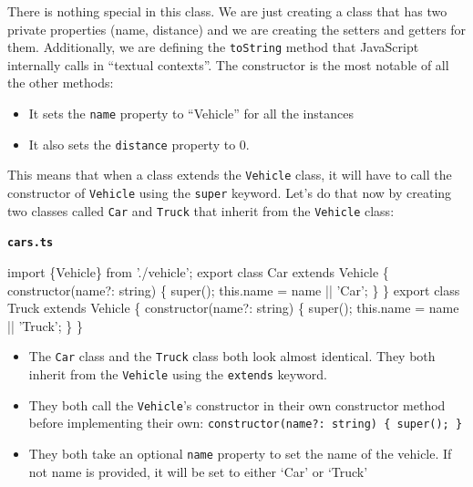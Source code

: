 \documentclass[12pt,]{article}
\newenvironment{Shaded}{}{}
\newcommand{\KeywordTok}[1]{\textcolor[rgb]{0.00,0.00,1.00}{{#1}}}
\newcommand{\FunctionTok}[1]{{#1}}
\newcommand{\NormalTok}[1]{{#1}}
\providecommand{\tightlist}{%
  \setlength{\itemsep}{0pt}\setlength{\parskip}{0pt}}
\begin{document}
There is nothing special in this class. We are just creating a class
that has two private properties (name, distance) and we are creating the
setters and getters for them. Additionally, we are defining the
\texttt{toString} method that JavaScript internally calls in ``textual
contexts''. The constructor is the most notable of all the other
methods:

\begin{itemize}
\tightlist
\item
  It sets the \texttt{name} property to ``Vehicle'' for all the
  instances
\item
  It also sets the \texttt{distance} property to 0.
\end{itemize}

This means that when a class extends the \texttt{Vehicle} class, it will
have to call the constructor of \texttt{Vehicle} using the
\texttt{super} keyword. Let's do that now by creating two classes called
\texttt{Car} and \texttt{Truck} that inherit from the \texttt{Vehicle}
class:

\textbf{\texttt{cars.ts}}

\begin{Shaded}
\begin{Highlighting}[numbers=left,,]
\KeywordTok{import \{Vehicle\} from './vehicle';}
\NormalTok{export }\KeywordTok{class} \NormalTok{Car }\KeywordTok{extends} \NormalTok{Vehicle \{}
  \FunctionTok{constructor}\NormalTok{(name?: string) \{}
    \KeywordTok{super}\NormalTok{();}
    \KeywordTok{this}\NormalTok{.}\FunctionTok{name} \NormalTok{= name || 'Car';}
  \NormalTok{\}}
\NormalTok{\}}
\NormalTok{export }\KeywordTok{class} \NormalTok{Truck }\KeywordTok{extends} \NormalTok{Vehicle \{}
  \FunctionTok{constructor}\NormalTok{(name?: string) \{}
    \KeywordTok{super}\NormalTok{();}
    \KeywordTok{this}\NormalTok{.}\FunctionTok{name} \NormalTok{= name || 'Truck';}
  \NormalTok{\}}
\NormalTok{\}}
\end{Highlighting}
\end{Shaded}

\begin{itemize}
\tightlist
\item
  The \texttt{Car} class and the \texttt{Truck} class both look almost
  identical. They both inherit from the \texttt{Vehicle} using the
  \texttt{extends} keyword.
\item
  They both call the \texttt{Vehicle}'s constructor in their own
  constructor method before implementing their own:
  \texttt{constructor(name?:\ string)\ \{\ super();\ \}}
\item
  They both take an optional \texttt{name} property to set the name of
  the vehicle. If not name is provided, it will be set to either `Car'
  or `Truck'
\end{itemize}
\end{document}
